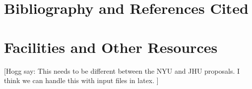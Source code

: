 \documentclass[11pt]{article}
\newcommand{\hogg}[1]{{\color{red}[Hogg say: #1 ]}}
\begin{document}
\clearpage
\section*{Bibliography and References Cited}

\renewcommand{\bibsection}{}


\clearpage
\section*{Facilities and Other Resources}
\hogg{This needs to be different between the NYU and JHU proposals. I think we can handle this with input files in latex.}


\end{document}
